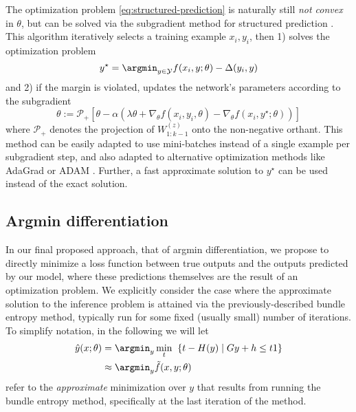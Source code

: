 The optimization problem \eqref{eq:structured-prediction} is naturally still
\emph{not convex} in $\theta$, but can be solved via the subgradient method
for structured prediction \citep{ratliff2007approximate}.  This algorithm
iteratively selects a training example $x_i, y_i$, then 1) solves the
optimization problem
\begin{equation}
y^\star = \argmin_{y \in \mathcal{Y}} f(x_i,y;\theta) - \Delta(y_i,y)
\end{equation}
and 2) if the margin is violated, updates the network's parameters according
to the subgradient
\begin{equation}
\theta := \mathcal{P}_+\left [ \theta - \alpha \left(
                \lambda\theta +
                \nabla_\theta f(x_i,y_i,\theta) -
                \nabla_\theta f (x_i, y^\star;\theta)\right)\right ]
\end{equation}
where $\mathcal{P}_+$ denotes the projection of $W^{(z)}_{1:k-1}$ onto the non-negative
orthant. This method can be easily adapted to use mini-batches instead of a
single example per subgradient step, and also adapted to alternative optimization
methods like AdaGrad \citep{duchi2011adaptive} or ADAM \citep{kingma2014adam}.
Further, a fast approximate solution to $y^\star$ can be used instead
of the exact solution.

\subsection{Argmin differentiation}

In our final proposed approach, that of argmin differentiation, we
propose to directly minimize a loss function between true outputs and the
outputs predicted by our model, where these predictions themselves are the
result of an optimization problem.  We explicitly consider the case where the
approximate solution to the inference problem is attained via the
previously-described bundle entropy method, typically run for some fixed
(usually small) number of iterations. To simplify notation, in the following we
will let
\begin{equation}
  \begin{split}
\hat{y}(x;\theta) &= \argmin_{y} \min_t \;\; \{t - H(y) \mid G y + h \leq t1 \} \\
& \approx \argmin_y \tilde{f}(x,y;\theta)
  \end{split}
\end{equation}
refer to the \emph{approximate} minimization over $y$ that
results from running the bundle entropy method, specifically at the last
iteration of the method.


